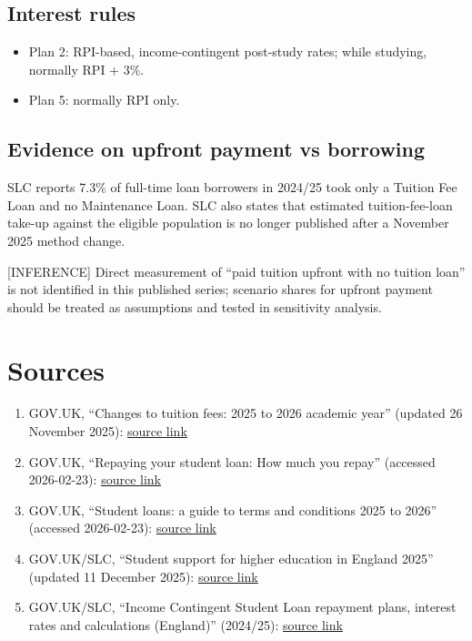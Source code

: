\documentclass[11pt]{article}
\begin{document}
\subsection{Interest rules}
\begin{itemize}
\item Plan 2: RPI-based, income-contingent post-study rates; while studying, normally RPI + 3\%.
\item Plan 5: normally RPI only.
\end{itemize}

\subsection{Evidence on upfront payment vs borrowing}
SLC reports 7.3\% of full-time loan borrowers in 2024/25 took only a Tuition Fee Loan and no Maintenance Loan. SLC also states that estimated tuition-fee-loan take-up against the eligible population is no longer published after a November 2025 method change.

[INFERENCE] Direct measurement of ``paid tuition upfront with no tuition loan'' is not identified in this published series; scenario shares for upfront payment should be treated as assumptions and tested in sensitivity analysis.

\section{Sources}
\begin{enumerate}
\item GOV.UK, ``Changes to tuition fees: 2025 to 2026 academic year'' (updated 26 November 2025): \href{https://www.gov.uk/government/publications/tuition-fees-and-student-support-2025-to-2026-academic-year/changes-to-tuition-fees-2025-to-2026-academic-year}{source link}
\item GOV.UK, ``Repaying your student loan: How much you repay'' (accessed 2026-02-23): \href{https://www.gov.uk/repaying-your-student-loan/what-you-pay}{source link}
\item GOV.UK, ``Student loans: a guide to terms and conditions 2025 to 2026'' (accessed 2026-02-23): \href{https://www.gov.uk/government/publications/student-loans-a-guide-to-terms-and-conditions/student-loans-a-guide-to-terms-and-conditions-2025-to-2026}{source link}
\item GOV.UK/SLC, ``Student support for higher education in England 2025'' (updated 11 December 2025): \href{https://www.gov.uk/government/statistics/student-support-for-higher-education-in-england-2025/student-support-for-higher-education-in-england-2025}{source link}
\item GOV.UK/SLC, ``Income Contingent Student Loan repayment plans, interest rates and calculations (England)'' (2024/25): \href{https://www.gov.uk/government/statistics/student-loans-in-england-2024-to-2025/income-contingent-student-loan-repayment-plans-interest-rates-and-calculations-england}{source link}
\end{enumerate}
\end{document}
